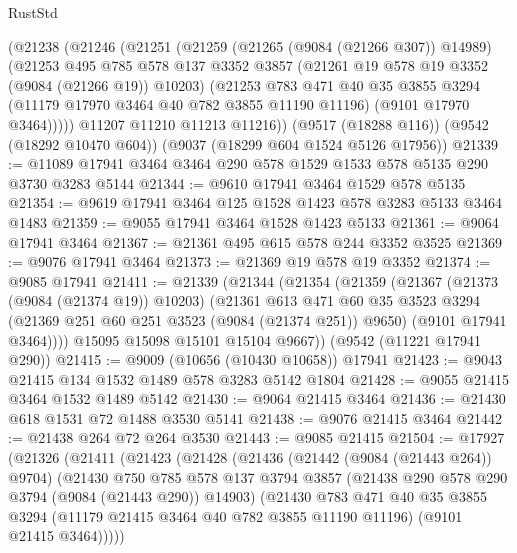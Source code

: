 \begin{lexlean}{RustStd}
\begin{coremodule}
    (@21238
      (@21246
        (@21251
          (@21259
            (@21265 (@9084 (@21266 @307)) @14989)
            (@21253
              @495
              @785
              @578
              @137
              @3352
              @3857
              (@21261 @19 @578 @19 @3352 (@9084 (@21266 @19)) @10203)
              (@21253
                @783
                @471
                @40
                @35
                @3855
                @3294
                (@11179 @17970 @3464 @40 @782 @3855 @11190 @11196)
                (@9101 @17970 @3464)))))
        @11207
        @11210
        @11213
        @11216))
    (@9517 (@18288 @116))
    (@9542 (@18292 @10470 @604))
    (@9037 (@18299 @604 @1524 @5126 @17956))
@21339 := @11089 @17941 @3464 @3464 @290 @578 @1529 @1533 @578 @5135 @290 @3730 @3283 @5144
@21344 := @9610 @17941 @3464 @1529 @578 @5135
@21354 := @9619 @17941 @3464 @125 @1528 @1423 @578 @3283 @5133 @3464 @1483
@21359 := @9055 @17941 @3464 @1528 @1423 @5133
@21361 := @9064 @17941 @3464
@21367 := @21361 @495 @615 @578 @244 @3352 @3525
@21369 := @9076 @17941 @3464
@21373 := @21369 @19 @578 @19 @3352
@21374 := @9085 @17941
@21411 := @21339
    (@21344
      (@21354
        (@21359
          (@21367
            (@21373 (@9084 (@21374 @19)) @10203)
            (@21361
              @613
              @471
              @60
              @35
              @3523
              @3294
              (@21369 @251 @60 @251 @3523 (@9084 (@21374 @251)) @9650)
              (@9101 @17941 @3464))))
        @15095
        @15098
        @15101
        @15104
        @9667))
    (@9542 (@11221 @17941 @290))
@21415 := @9009 (@10656 (@10430 @10658)) @17941
@21423 := @9043 @21415 @134 @1532 @1489 @578 @3283 @5142 @1804
@21428 := @9055 @21415 @3464 @1532 @1489 @5142
@21430 := @9064 @21415 @3464
@21436 := @21430 @618 @1531 @72 @1488 @3530 @5141
@21438 := @9076 @21415 @3464
@21442 := @21438 @264 @72 @264 @3530
@21443 := @9085 @21415
@21504 := @17927
    (@21326
      (@21411
        (@21423
          (@21428
            (@21436
              (@21442 (@9084 (@21443 @264)) @9704)
              (@21430
                @750
                @785
                @578
                @137
                @3794
                @3857
                (@21438 @290 @578 @290 @3794 (@9084 (@21443 @290)) @14903)
                (@21430
                  @783
                  @471
                  @40
                  @35
                  @3855
                  @3294
                  (@11179 @21415 @3464 @40 @782 @3855 @11190 @11196)
                  (@9101 @21415 @3464)))))

\end{coremodule}
\end{lexlean}
